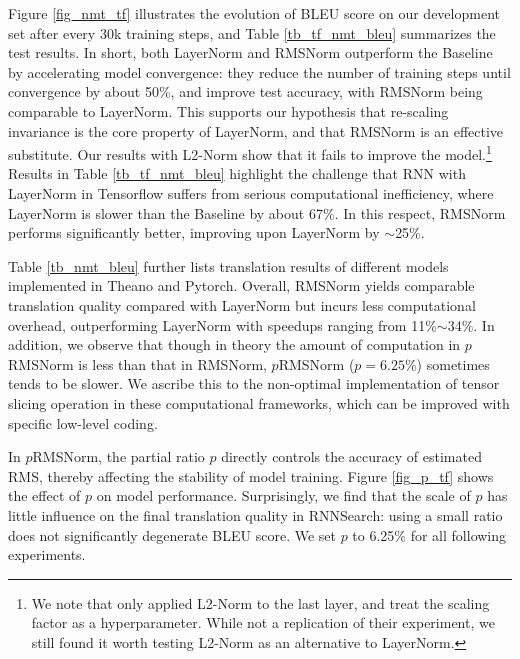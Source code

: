 \documentclass{article}
\begin{document}
Figure \ref{fig_nmt_tf} illustrates the evolution of BLEU score on our development set after every 30k training steps, and Table \ref{tb_tf_nmt_bleu} summarizes the test results. In short, both LayerNorm and RMSNorm outperform the Baseline by accelerating model convergence: they reduce the number of training steps until convergence by about 50\%, and improve test accuracy, with RMSNorm being comparable to LayerNorm. 
This supports our hypothesis that re-scaling invariance is the core property of LayerNorm, and that RMSNorm is an effective substitute.
Our results with L2-Norm show that it fails to improve the model.\footnote{We note that \citet{nguyen2017improving} only applied L2-Norm to the last layer, and treat the scaling factor as a hyperparameter. While not a replication of their experiment, we still found it worth testing L2-Norm as an alternative to LayerNorm.} Results in Table \ref{tb_tf_nmt_bleu} highlight the challenge that RNN with LayerNorm in Tensorflow suffers from serious computational inefficiency, where LayerNorm is slower than the Baseline by about 67\%. In this respect, RMSNorm performs significantly better, improving upon LayerNorm by $\sim$25\%. 

Table \ref{tb_nmt_bleu} further lists translation results of different models implemented in Theano and Pytorch. Overall, RMSNorm yields comparable translation quality compared with LayerNorm but incurs less computational overhead, outperforming LayerNorm with speedups ranging from 11\%$\sim$34\%. In addition, we observe that though in theory the amount of computation in $p$RMSNorm is less than that in RMSNorm, $p$RMSNorm ($p=6.25\%$) sometimes tends to be slower. We ascribe this to the non-optimal implementation of tensor slicing operation in these computational frameworks, which can be improved with specific low-level coding.

In $p$RMSNorm, the partial ratio $p$ directly controls the accuracy of estimated RMS, thereby affecting the stability of model training. Figure \ref{fig_p_tf} shows the effect of $p$ on model performance. Surprisingly, we find that the scale of $p$ has little influence on the final translation quality in RNNSearch: using a small ratio does not significantly degenerate BLEU score. We set $p$ to 6.25\% for all following experiments. 
\end{document}
